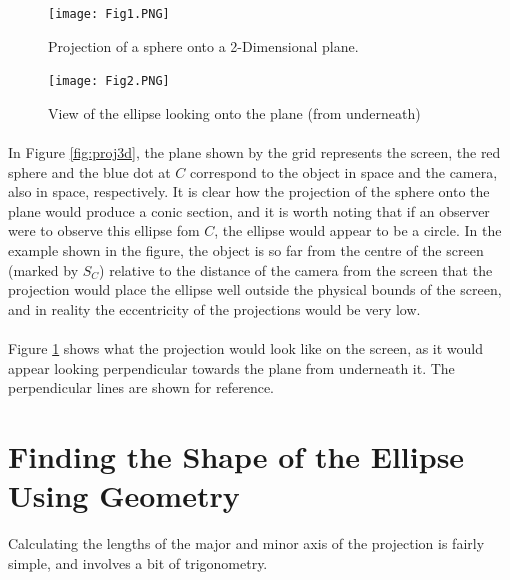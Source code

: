 \documentclass{article}
\newcommand\dd{{2-Dimensional}\xspace}
\begin{document}
	\begin{figure}
		\texttt{[image: Fig1.PNG]}
		\caption{Projection of a sphere onto a \dd plane.}
		\label{fig:proj3d}
		\texttt{[image: Fig2.PNG]}
		\caption{View of the ellipse looking onto the plane (from underneath)}
		\label{fig:proj2d}
	\end{figure}

	\paragraph{}
	In Figure \ref{fig:proj3d}, the plane shown by the grid represents the screen, the red sphere and the blue dot at $C$ correspond to the object in space and
	the camera, also in space, respectively. It is clear how the projection of the sphere onto the plane would produce a conic section, and it is
	worth noting that if an observer were to observe this ellipse fom $C$, the ellipse would appear to be a circle. In the example shown in the
	figure, the object is so far from the centre of the screen (marked by $S_C$) relative to the distance of the camera from the screen that the
	projection would place the ellipse well outside the physical bounds of the screen, and in reality the eccentricity of the projections would be very low.
	\paragraph{}
	Figure \ref{fig:proj2d} shows what the projection would look like on the screen, as it would appear looking perpendicular towards the plane from
	underneath it. The perpendicular lines are shown for reference.


\section{Finding the Shape of the Ellipse Using Geometry}
	Calculating the lengths of the major and minor axis of the projection is fairly simple, and involves a bit of trigonometry.
\end{document}
